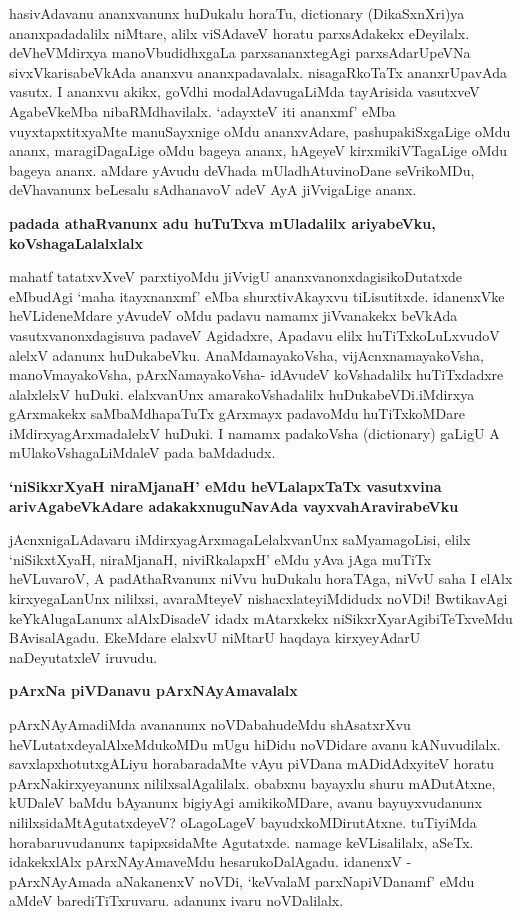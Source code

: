 \noindent
hasivAdavanu ananxvanunx huDukalu horaTu, {\rm dictionary} (DikaSxnXri)ya ananx\-padadalilx niMtare, alilx viSAdaveV horatu parxsAdakekx eDeyilalx. deVheVMdirxya manoVbudidhxgaLa parxsananxtegAgi parxsAda\-rUpeVNa sivxVkarisabeVkAda ananxvu ananx\-padavalalx. nisagaRkoTaTx ananxrUpavAda vasutx. I ananxvu akikx, goVdhi modalAdavugaLiMda tayArisida vasutxveV AgabeVkeMba nibaRMdhavilalx. `adayxteV iti ananxmf' eMba vuyxtapxtitxyaMte manuSayxnige oMdu ananxvAdare, pashupakiSxgaLige oMdu ananx, maragiDagaLige oMdu bageya ananx, hAgeyeV kirxmikiVTagaLige oMdu bageya ananx. aMdare yAvudu deVhada mUladhAtuvi\-noDane seVrikoMDu, deVhavanunx beLesalu sAdhanavoV adeV AyA jiVvigaLige ananx.

{\bigskip
\noindent
{\large\bf padada athaRvanunx adu huTuTxva mUladalilx ariyabeVku, koVshagaLalalxlalx}}
\medskip

\noindent
mahatf tatatxvXveV parxtiyoMdu jiVvigU ananxvanonxdagisikoDutatxde eMbu\-dAgi `maha itayxnanxmf' eMba shurxtivAkayxvu tiLisutitxde. idanenxVke heVLideneMdare yAvudeV oMdu padavu namamx jiVvanakekx beVkAda vasutxvanonxdagisuva padaveV Agidadxre, A\break padavu elilx huTiTxkoLuLxvudoV alelxV adanunx huDukabeVku. AnaMdamayakoVsha, vijAcnxnamayakoVsha, manoVmayakoVsha, pArxNamayakoVsha- idAvudeV koVsha\-dalilx huTiTxdadxre alalxlelxV huDuki. elalxvanUnx amarakoVshadalilx huDukabeVDi.\break iMdirxya gArxmakekx saMbaMdha\-paTuTx gArxmayx padavoMdu huTiTxkoMDare iMdirxya\-gArxma\-dalelxV huDuki. I namamx padakoVsha {\rm (dictionary)} gaLigU A mUlakoVsha\-gaLiMdaleV pada baMdadudx.

{\bigskip
\noindent
{\large\bf `niSikxrXyaH niraMjanaH' eMdu heVLalapxTaTx vasutxvina arivAgabeVkAdare adakakxnuguNavAda vayxvahAra\-virabeVku}}
\medskip

\noindent
jAcnxnigaLAdavaru iMdirxyagArxmagaLelalxvanUnx saMyamagoLisi, elilx `niSikxtXyaH, niraMjanaH, niviR\-kalapxH' eMdu yAva jAga muTiTx heVLuvaroV, A padAthaRvanunx niVvu huDukalu horaTAga, niVvU saha I elAlx kirxyegaLanUnx nililxsi, avaraMteyeV nishacxlateyiMdidudx noVDi! BwtikavAgi keYkAlugaLanunx alAlxDisadeV idadx mAtarxkekx niSikxrXyarAgibiTeTxveMdu BAvisalAgadu. EkeMdare elalxvU niMtarU haqdaya kirxyeyAdarU naDeyutatxleV iruvudu.

\newpage
{\noindent
{\large\bf pArxNa piVDanavu pArxNAyAmavalalx}}\label{page202}
\medskip

\noindent
pArxNAyAmadiMda avananunx noVDabahudeMdu shAsatxrXvu heVLutatxdeyalAlx\break eMdukoMDu mUgu hiDidu noVDidare avanu kANuvudilalx. savxlapxhotutx\break gALiyu horabaradaMte vAyu piVDana mADi\-dAdxyiteV horatu pArxNakirxye\-yanunx nililxsalAgalilalx. obabxnu bayayxlu shuru mADutAtxne, kUDaleV baMdu \hbox{bAyanunx} bigiyAgi amikikoMDare, avanu bayuyxvudanunx nililxsidaMtAgu\-tatxdeyeV? oLago\-LageV bayudxkoMDirutAtxne. tuTiyiMda horabaruvudanunx tapipxsidaMte Agutatxde. namage keVLisa\-lilalx, aSeTx. idakekxlAlx pArxNAyAmaveMdu hesarukoDalAgadu. idanenxV - pArxNAyAmada aNakanenxV noVDi, `keVvalaM parxNapiVDanamf' eMdu aMdeV barediTiTxruvaru. adanunx ivaru noVDalilalx.

